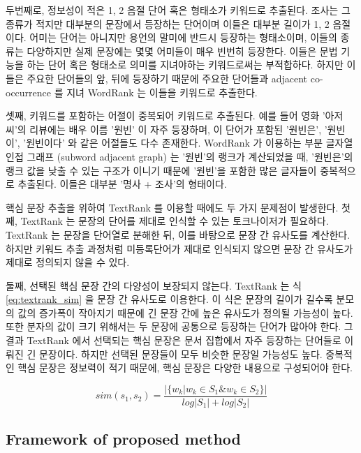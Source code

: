 \documentclass[11pt]{article}
\begin{document}
두번째로, 정보성이 적은 1, 2 음절 단어 혹은 형태소가 키워드로 추출된다.
조사는 그 종류가 적지만 대부분의 문장에서 등장하는 단어이며 이들은 대부분 길이가 1, 2 음절이다.
어미는 단어는 아니지만 용언의 말미에 반드시 등장하는 형태소이며, 이들의 종류는 다양하지만 실제 문장에는 몇몇 어미들이 매우 빈번히 등장한다.
이들은 문법 기능을 하는 단어 혹은 형태소로 의미를 지녀야하는 키워드로써는 부적합하다.
하지만 이들은 주요한 단어들의 앞, 뒤에 등장하기 때문에 주요한 단어들과 adjacent co-occurrence 를 지녀 WordRank 는 이들을 키워드로 추출한다.

셋째, 키워드를 포함하는 어절이 중복되어 키워드로 추출된다.
예를 들어 영화 '아저씨'의 리뷰에는 배우 이름 '원빈' 이 자주 등장하며, 이 단어가 포함된 '원빈은', '원빈이', '원빈이다' 와 같은 어절들도 다수 존재한다.
WordRank 가 이용하는 부분 글자열 인접 그래프 (subword adjacent graph) 는 '원빈'의 랭크가 계산되었을 때, '원빈은'의 랭크 값을 낮출 수 있는 구조가 이니기 때문에 '원빈'을 포함한 많은 글자들이 중복적으로 추출된다.
이들은 대부분 '명사 + 조사'의 형태이다.

핵심 문장 추출을 위하여 TextRank 를 이용할 때에도 두 가지 문제점이 발생한다.
첫째, TextRank 는 문장의 단어를 제대로 인식할 수 있는 토크나이저가 필요하다.
TextRank 는 문장을 단어열로 분해한 뒤, 이를 바탕으로 문장 간 유사도를 계산한다.
하지만 키워드 추출 과정처럼 미등록단어가 제대로 인식되지 않으면 문장 간 유사도가 제대로 정의되지 않을 수 있다.

둘째, 선택된 핵심 문장 간의 다양성이 보장되지 않는다.
TextRank 는 식 \ref{eq:textrank_sim} 을 문장 간 유사도로 이용한다.
이 식은 문장의 길이가 길수록 분모의 값의 증가폭이 작아지기 때문에 긴 문장 간에 높은 유사도가 정의될 가능성이 높다.
또한 분자의 값이 크기 위해서는 두 문장에 공통으로 등장하는 단어가 많아야 한다.
그 결과 TextRank 에서 선택되는 핵심 문장은 문서 집합에서 자주 등장하는 단어들로 이뤄진 긴 문장이다.
하지만 선택된 문장들이 모두 비슷한 문장일 가능성도 높다.
중복적인 핵심 문장은 정보력이 적기 때문에, 핵심 문장은 다양한 내용으로 구성되어야 한다.

\begin{equation}
    \label{eq:textrank_sim}
    sim(s_1, s_2) = \frac{\vert \{ w_k \vert w_k \in S_1 \& w_k \in S_2 \} \vert}{log \vert S_1 \vert + log \vert S_2 \vert}
\end{equation}

\subsection{Framework of proposed method}
\end{document}
